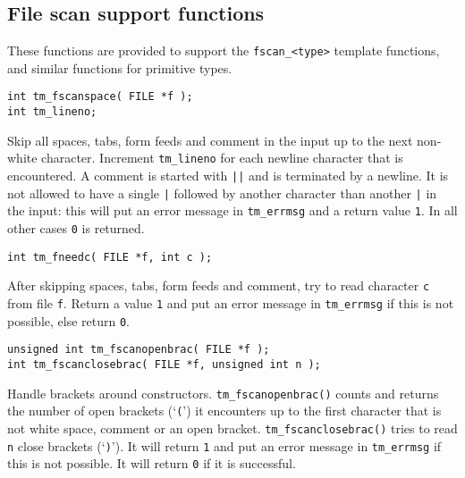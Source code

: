 \subsection{File scan support functions}
These functions are provided to support the \verb'fscan_<type>' template
functions, and similar functions for primitive types.
\par
\begin{verbatim}
int tm_fscanspace( FILE *f );
int tm_lineno;
\end{verbatim}
\begin{desc}
Skip all spaces, tabs, form feeds and comment in the input up to the
next non-white character.
Increment \texttt{tm\_lineno} for each newline character that is encountered.
A comment is started with \texttt{||} and is terminated by a newline.
It is not allowed to have a single \texttt{|}
followed by another character than another \texttt{|} in the input:
this will put an error message in \texttt{tm\_errmsg} and a return value \texttt{1}.
In all other cases \texttt{0} is returned.
\end{desc}
\begin{verbatim}
int tm_fneedc( FILE *f, int c );
\end{verbatim}
\begin{desc}
After skipping spaces, tabs, form feeds and comment,
try to read character \texttt{c} from file \texttt{f}.
Return a value \texttt{1} and put an error message in \texttt{tm\_errmsg} if this
is not possible,
else return \texttt{0}.
\end{desc}
\begin{verbatim}
unsigned int tm_fscanopenbrac( FILE *f );
int tm_fscanclosebrac( FILE *f, unsigned int n );
\end{verbatim}
\begin{desc}
\begin{sloppypar}
Handle brackets around constructors.
\verb+tm_fscanopenbrac()+ counts and returns the number
of open brackets (`\texttt{(}') it encounters up to the first character
that is not white space, comment or an open bracket.
\verb+tm_fscanclosebrac()+ tries to read \texttt{n} close brackets (`\texttt{)}').
It will return \texttt{1} and put an error message in \texttt{tm\_errmsg} if this is
not possible.
It will return \texttt{0} if it is successful.
\end{sloppypar}
\end{desc}
